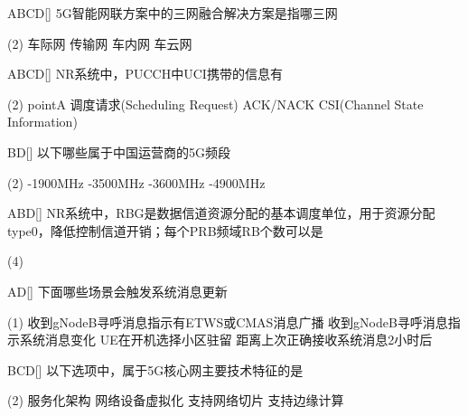 \begin{choice}{\;ABCD\;}[]
    5G智能网联方案中的三网融合解决方案是指哪三网
    \begin{tasks}(2)
        \task 车际网
        \task 传输网
        \task 车内网
        \task 车云网
    \end{tasks}
\end{choice}

\begin{choice}{\;ABCD\;}[]
    NR系统中，PUCCH中UCI携带的信息有
    \begin{tasks}(2)
        \task pointA
        \task 调度请求(Scheduling Request)
        \task ACK/NACK
        \task CSI(Channel State Information)
    \end{tasks}
\end{choice}

\begin{choice}{\;BD\;}[]
    以下哪些属于中国运营商的5G频段
    \begin{tasks}(2)
        -1900MHz
        -3500MHz
        -3600MHz
        -4900MHz
    \end{tasks}
\end{choice}

\begin{choice}{\;ABD\;}[]
    NR系统中，RBG是数据信道资源分配的基本调度单位，用于资源分配type0，降低控制信道开销；每个PRB频域RB个数可以是
    \begin{tasks}(4)
    \end{tasks}
\end{choice}

\begin{choice}{\;AD\;}[]
    下面哪些场景会触发系统消息更新
    \begin{tasks}(1)
        \task 收到gNodeB寻呼消息指示有ETWS或CMAS消息广播
        \task 收到gNodeB寻呼消息指示系统消息变化
        \task  UE在开机选择小区驻留
        \task 距离上次正确接收系统消息2小时后
    \end{tasks}
\end{choice}

\begin{choice}{\;BCD\;}[]
    以下选项中，属于5G核心网主要技术特征的是
    \begin{tasks}(2)
        \task 服务化架构
        \task 网络设备虚拟化
        \task 支持网络切片
        \task 支持边缘计算
    \end{tasks}
\end{choice}

